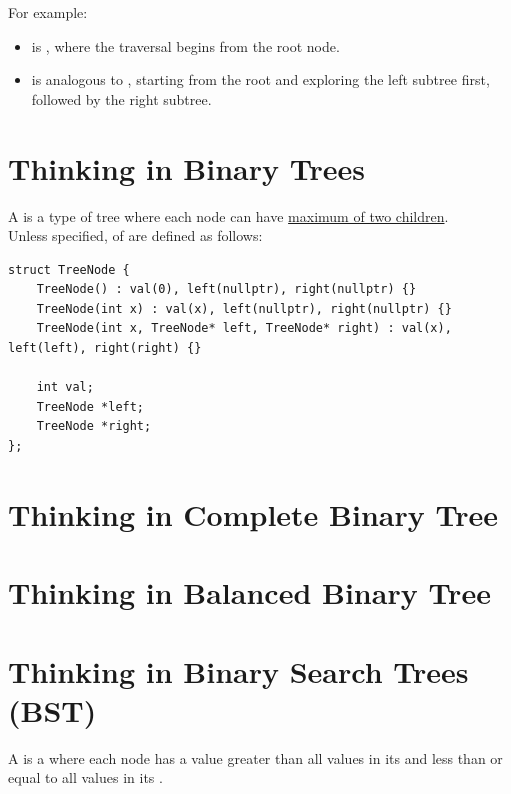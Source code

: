 For example:
\begin{itemize}
	\item {\color{blue}{Level-order traversal in trees}} is {\color{blue}{BFS in graphs}}, where the traversal begins from the root node.
	\item {\color{blue}{Pre-order traversal in trees}} is analogous to {\color{blue}{DFS in graphs}}, starting from the root and exploring the left subtree first, followed by the right subtree.
\end{itemize}

\section{Thinking in Binary Trees}
A {\color{blue}{binary tree}} is a type of tree where each node can have \ul{maximum of two children}.\\

\hdashrule[0.5ex]{\linewidth}{0.5pt}{1mm 3pt}
Unless specified, {\color{blue}{nodes}} of {\color{blue}{binary trees}} are defined as follows:
\begin{lstlisting}
struct TreeNode {
	TreeNode() : val(0), left(nullptr), right(nullptr) {}
	TreeNode(int x) : val(x), left(nullptr), right(nullptr) {}
	TreeNode(int x, TreeNode* left, TreeNode* right) : val(x), left(left), right(right) {}
	
	int val;
	TreeNode *left;
	TreeNode *right;
};
\end{lstlisting}
\hdashrule[0.5ex]{\linewidth}{0.5pt}{1mm 3pt}

\section{Thinking in Complete Binary Tree}

\section{Thinking in Balanced Binary Tree}

\section{Thinking in Binary Search Trees (BST)}
A {\color{blue}{binary search tree (BST)}} is a {\color{blue}{binary tree}} where each node has a value greater than all values in its {\color{blue}{left subtree}} and less than or equal to all values in its {\color{blue}{right subtree}}. \\

